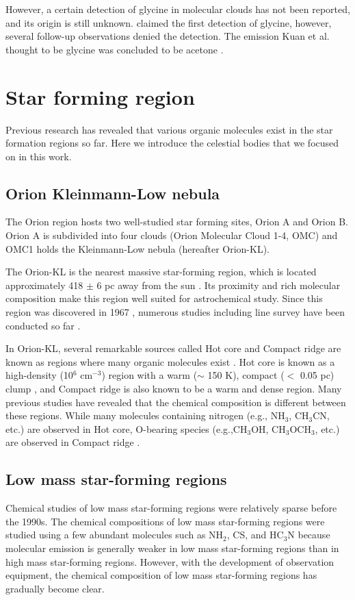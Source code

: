 However, a certain detection of glycine in molecular clouds has not been reported, and
its origin is still unknown.
\citet{Kuan+2003} claimed the first detection of glycine, however, several follow-up observations 
denied the detection.
The emission Kuan et al. thought to be glycine was concluded to be acetone
\citep[e.g.,][]{Jones+2007}.

\newpage
\section{Star forming region}
Previous research has revealed that various organic molecules exist in the star formation regions so far. 
Here we introduce the celestial bodies that we focused on in this work.
\subsection{Orion Kleinmann-Low nebula}
The Orion region hosts two well-studied star forming sites, Orion A and Orion B. 
Orion A is subdivided into four clouds (Orion Molecular Cloud 1-4, OMC) and 
OMC1 holds the Kleinmann-Low nebula (hereafter Orion-KL).

The Orion-KL is the nearest massive star-forming region, which is located approximately 
418 $\pm$ 6 pc away from the sun \citep{Kim+2008}. 
Its proximity and rich molecular composition make this region well suited for astrochemical study.
Since this region was discovered in 1967 \citep*{Kleinmann+1967},
numerous studies including line survey have been conducted so far \citep[e.g.,][]{Pagani+2017, Feng+2015, Gong+2015, Turner1991}.

In Orion-KL, several remarkable sources called Hot core and Compact ridge are known as regions where many organic molecules exist \citep{Blake+1987}. 
Hot core is known as a high-density (10$^6$ cm$^{-3}$) region with a warm ($\sim$ 150 K), compact ($<$ 0.05 pc) clump \citep{Zapata+2011}, and Compact ridge is also known to be a warm and dense region. 
Many previous studies have revealed that the chemical composition is different between these regions.
While many molecules containing nitrogen (e.g., NH$_3$, CH$_3$CN, etc.) are observed 
in Hot core, 
O-bearing species (e.g.,CH$_3$OH, CH$_3$OCH$_3$, etc.) are observed in Compact ridge \citep{Favre+2011a}.

\subsection{Low mass star-forming regions}
Chemical studies of low mass star-forming regions were relatively sparse before the 1990s.
The chemical compositions of low mass star-forming regions were studied using a few abundant
molecules such as NH$_2$, CS, and HC$_3$N because molecular emission is generally weaker in low mass star-forming regions than in high mass star-forming regions. 
However, with the development of observation equipment, the chemical composition of 
low mass star-forming regions has gradually become clear.

